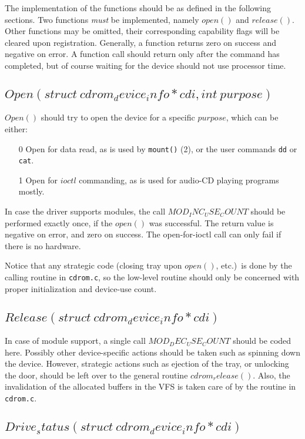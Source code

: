 \documentclass{article}
\def\cdromc{{\tt cdrom.c}}
\begin{document}
The implementation of the functions should be as defined in the
following sections. Two functions {\em must\/} be implemented, namely
$open()$ and $release()$. Other functions may be omitted, their
corresponding capability flags will be cleared upon registration.
Generally, a function returns zero on success and negative on error. A
function call should return only after the command has completed, but
of course waiting for the device should not use processor time.

\subsection{$Open(struct\ cdrom_device_info * cdi, int\ purpose)$}

$Open()$ should try to open the device for a specific $purpose$, which
can be either:
\begin{itemize}
\item[0] Open for data read, as is used by {\tt mount()} (2), or the
user commands {\tt dd} or {\tt cat}.  
\item[1] Open for $ioctl$ commanding, as is used for audio-CD playing
programs mostly. 
\end{itemize}
In case the driver supports modules, the call $MOD_INC_USE_COUNT$
should be performed exactly once, if the $open()$ was successful. The
return value is negative on error, and zero on success. The
open-for-ioctl call can only fail if there is no hardware.

Notice that any strategic code (closing tray upon $open()$, etc.)\ is
done by the calling routine in \cdromc, so the low-level routine
should only be concerned with proper initialization and device-use
count.

\subsection{$Release(struct\ cdrom_device_info * cdi)$}

In case of module support, a single call $MOD_DEC_USE_COUNT$ should be
coded here.  Possibly other device-specific actions should be taken
such as spinning down the device. However, strategic actions such as
ejection of the tray, or unlocking the door, should be left over to
the general routine $cdrom_release()$. Also, the invalidation of the
allocated buffers in the VFS is taken care of by the routine in
\cdromc.

\subsection{$Drive_status(struct\ cdrom_device_info * cdi)$}
\label{drive status}
\end{document}
